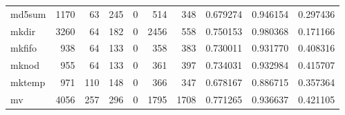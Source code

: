\begin{longtable}{lrrrrrrrrr}
md5sum    &                                1170 &                                              63 &                                            245 &                                             0 &                                            514 &                                          348 &                                           0.679274 &                               0.946154 &                             0.297436 \\
mkdir     &                                3260 &                                              64 &                                            182 &                                             0 &                                           2456 &                                          558 &                                           0.750153 &                               0.980368 &                             0.171166 \\
mkfifo    &                                 938 &                                              64 &                                            133 &                                             0 &                                            358 &                                          383 &                                           0.730011 &                               0.931770 &                             0.408316 \\
mknod     &                                 955 &                                              64 &                                            133 &                                             0 &                                            361 &                                          397 &                                           0.734031 &                               0.932984 &                             0.415707 \\
mktemp    &                                 971 &                                             110 &                                            148 &                                             0 &                                            366 &                                          347 &                                           0.678167 &                               0.886715 &                             0.357364 \\
mv        &                                4056 &                                             257 &                                            296 &                                             0 &                                           1795 &                                         1708 &                                           0.771265 &                               0.936637 &                             0.421105 \\

\end{longtable}
